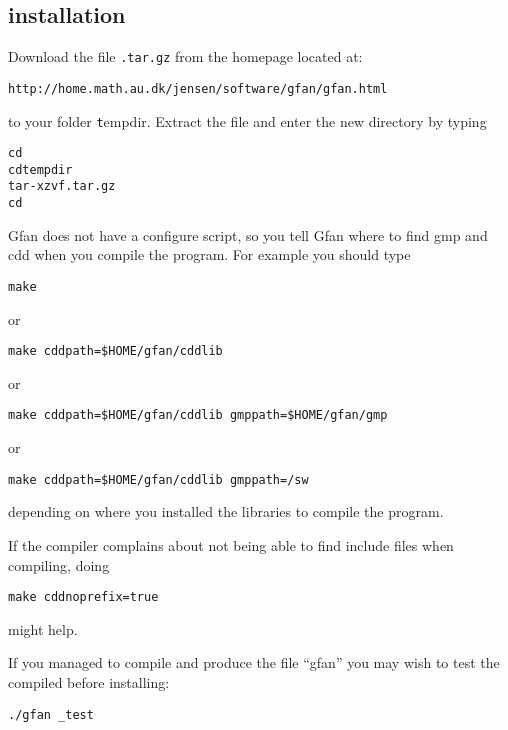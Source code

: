 \subsection{\name installation}
\label{subsec:installation}
\color{red}
Download the file {\tt \nameversion .tar.gz} from the \name
homepage located at:
\begin{verbatim}
http://home.math.au.dk/jensen/software/gfan/gfan.html
\end{verbatim}
to your folder {\texttt tempdir}.
\noindent
Extract the file and enter the new directory by typing
\begin{alltt}
cd ~
cd tempdir
tar -xzvf \nameversion.tar.gz
cd \nameversion
\end{alltt}
\color{black}
Gfan does not have a configure script, so you tell Gfan where to find gmp and cdd when you compile the program. For example you should type
\begin{verbatim}
make
\end{verbatim}
or

\color{red}
\begin{verbatim}
make cddpath=$HOME/gfan/cddlib
\end{verbatim}
\color{black}
or
\begin{verbatim}
make cddpath=$HOME/gfan/cddlib gmppath=$HOME/gfan/gmp
\end{verbatim}
or
\begin{verbatim}
make cddpath=$HOME/gfan/cddlib gmppath=/sw
\end{verbatim}
depending on where you installed the libraries to compile the program.

If the compiler complains about not being able to find include files when compiling, doing
\begin{verbatim}
make cddnoprefix=true
\end{verbatim}
might help.

If you managed to compile and produce the file ``gfan'' you may wish to test the compiled \name before installing:
\begin{verbatim}
./gfan _test
\end{verbatim}

